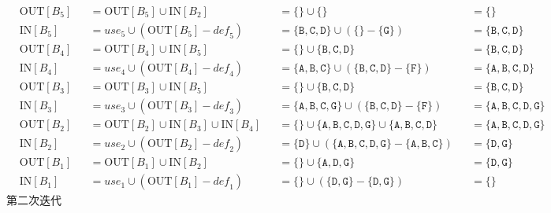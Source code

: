 \documentclass{article}
\begin{document}
\begin{align*}
    & \text{OUT}[B_5] &&= \text{OUT}[B_5] \cup \text{IN}[B_2]    &&= \{  \} \cup \{  \} &&= \{  \} \\
    & \text{IN}[B_5]  &&= \textit{use}_5 \cup ( \text{OUT}[B_5] - \textit{def}_5 ) &&= \{\texttt{B},\texttt{C},\texttt{D}\} \cup ( \{  \} - \{\texttt{G}\} ) &&= \{\texttt{B},\texttt{C},\texttt{D}\} \\
    & \text{OUT}[B_4] &&= \text{OUT}[B_4] \cup \text{IN}[B_5]    &&= \{  \} \cup \{\texttt{B},\texttt{C},\texttt{D}\} &&= \{\texttt{B},\texttt{C},\texttt{D}\} \\
    & \text{IN}[B_4]  &&= \textit{use}_4 \cup ( \text{OUT}[B_4] - \textit{def}_4 ) &&= \{\texttt{A},\texttt{B},\texttt{C}\} \cup ( \{\texttt{B},\texttt{C},\texttt{D}\} - \{\texttt{F}\} ) &&= \{\texttt{A},\texttt{B},\texttt{C},\texttt{D}\} \\
    & \text{OUT}[B_3] &&= \text{OUT}[B_3] \cup \text{IN}[B_5]    &&= \{  \} \cup \{\texttt{B},\texttt{C},\texttt{D}\} &&= \{\texttt{B},\texttt{C},\texttt{D}\} \\
    & \text{IN}[B_3]  &&= \textit{use}_3 \cup ( \text{OUT}[B_3] - \textit{def}_3 ) &&= \{\texttt{A},\texttt{B},\texttt{C},\texttt{G}\} \cup ( \{\texttt{B},\texttt{C},\texttt{D}\} - \{\texttt{F}\} ) &&= \{\texttt{A},\texttt{B},\texttt{C},\texttt{D},\texttt{G}\} \\
    & \text{OUT}[B_2] &&= \text{OUT}[B_2] \cup \text{IN}[B_3] \cup \text{IN}[B_4]    &&= \{  \} \cup \{\texttt{A},\texttt{B},\texttt{C},\texttt{D},\texttt{G}\} \cup \{\texttt{A},\texttt{B},\texttt{C},\texttt{D}\} &&= \{\texttt{A},\texttt{B},\texttt{C},\texttt{D},\texttt{G}\} \\
    & \text{IN}[B_2]  &&= \textit{use}_2 \cup ( \text{OUT}[B_2] - \textit{def}_2 ) &&= \{\texttt{D}\} \cup ( \{\texttt{A},\texttt{B},\texttt{C},\texttt{D},\texttt{G}\} - \{\texttt{A},\texttt{B},\texttt{C}\} ) &&= \{\texttt{D},\texttt{G}\} \\
    & \text{OUT}[B_1] &&= \text{OUT}[B_1] \cup \text{IN}[B_2]    &&= \{  \} \cup \{\texttt{A},\texttt{D},\texttt{G}\} &&= \{\texttt{D},\texttt{G}\} \\
    & \text{IN}[B_1]  &&= \textit{use}_1 \cup ( \text{OUT}[B_1] - \textit{def}_1 ) &&= \{  \} \cup ( \{\texttt{D},\texttt{G}\} - \{\texttt{D},\texttt{G}\} ) &&= \{  \}
\end{align*}
第二次迭代
\end{document}
